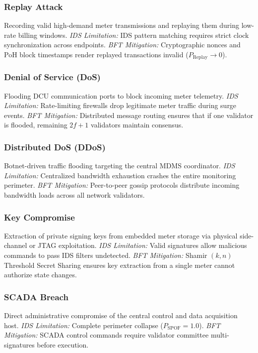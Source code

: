 \documentclass[10pt,twocolumn,journal]{IEEEtran}
\begin{document}
\subsubsection{Replay Attack} Recording valid high-demand meter transmissions and replaying them during low-rate billing windows. \emph{IDS Limitation:} IDS pattern matching requires strict clock synchronization across endpoints. \emph{BFT Mitigation:} Cryptographic nonces and PoH block timestamps render replayed transactions invalid ($P_{\text{Replay}} \to 0$).

\subsubsection{Denial of Service (DoS)} Flooding DCU communication ports to block incoming meter telemetry. \emph{IDS Limitation:} Rate-limiting firewalls drop legitimate meter traffic during surge events. \emph{BFT Mitigation:} Distributed message routing ensures that if one validator is flooded, remaining $2f+1$ validators maintain consensus.

\subsubsection{Distributed DoS (DDoS)} Botnet-driven traffic flooding targeting the central MDMS coordinator. \emph{IDS Limitation:} Centralized bandwidth exhaustion crashes the entire monitoring perimeter. \emph{BFT Mitigation:} Peer-to-peer gossip protocols distribute incoming bandwidth loads across all network validators.

\subsubsection{Key Compromise} Extraction of private signing keys from embedded meter storage via physical side-channel or JTAG exploitation. \emph{IDS Limitation:} Valid signatures allow malicious commands to pass IDS filters undetected. \emph{BFT Mitigation:} Shamir $(k, n)$ Threshold Secret Sharing ensures key extraction from a single meter cannot authorize state changes.

\subsubsection{SCADA Breach} Direct administrative compromise of the central control and data acquisition host. \emph{IDS Limitation:} Complete perimeter collapse ($P_{\text{SPOF}} = 1.0$). \emph{BFT Mitigation:} SCADA control commands require validator committee multi-signatures before execution.
\end{document}
